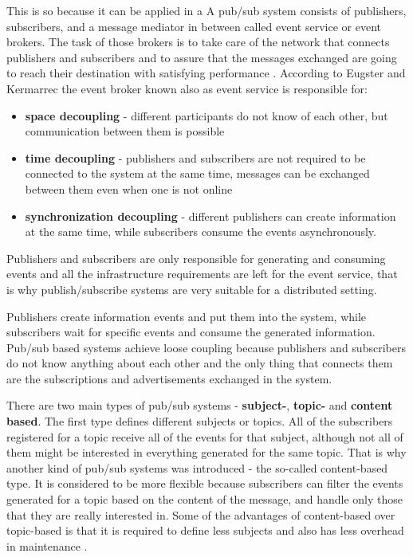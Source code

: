 \documentclass{sigplanconf}
\begin{document}
 This is so because it can be applied in a  A pub/sub system consists of publishers, subscribers, and a message mediator in between called event service or event brokers. The task of those brokers is to take care of the network that connects publishers and subscribers and to assure that the messages exchanged are going to reach their destination with satisfying performance \cite{pubsub1}. According to  Eugster and Kermarrec \cite{pubsub4} the event broker known also as event service is responsible for:

\begin{itemize} \itemsep1pt \parskip0pt 
  \item \textbf{space decoupling} - different participants do not know of each other, but communication between them is possible
  \item \textbf{time decoupling} - publishers and subscribers are not required to be connected to the system at the same time, messages can be exchanged between them even when one is not online
  \item \textbf{synchronization decoupling} - different publishers can create information at the same time, while subscribers consume the events asynchronously.
\end{itemize}

Publishers and subscribers are only responsible for generating and consuming events and all the infrastructure requirements are left for the event service, that is why publish/subscribe systems are very suitable for a distributed setting.

Publishers create information events and put them into the system, while subscribers wait for specific events and consume the generated information. Pub/sub based systems achieve loose coupling because publishers and subscribers do not know anything about each other and the only thing that connects them are the subscriptions and advertisements exchanged in the system.

There are two main types of pub/sub systems - \textbf{subject-}, \textbf{topic-} and \textbf{content based}. The first type defines different subjects or topics. All of the subscribers registered for a topic receive all of the events for that subject, although not all of them might be interested in everything generated for the same topic. That is why another kind of pub/sub systems was introduced - the so-called content-based type. It is considered to be more flexible because subscribers can filter the events generated for a topic based on the content of the message, and handle only those that they are really interested in. Some of the advantages of content-based over topic-based is that it is required to define less subjects and also has less overhead in maintenance \cite{pubsuburl}.
\end{document}
